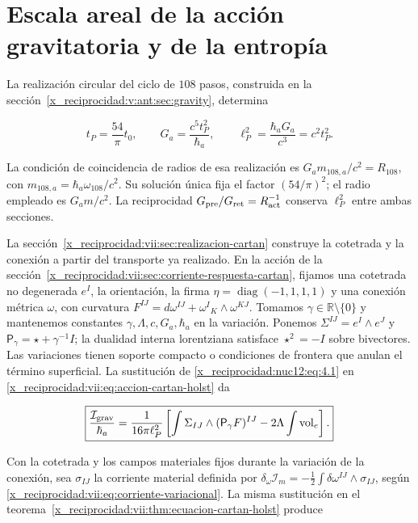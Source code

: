 \section{Escala areal de la acción gravitatoria y de la entropía}

La realización circular del ciclo de \(108\) pasos, construida en la sección~\ref{x_reciprocidad:v:ant:sec:gravity}, determina



\begin{equation}
t_P=\frac{54}{\pi}t_0,\qquad
G_a=\frac{c^5t_P^2}{\hbar_a},\qquad
\ell_P^2=\frac{\hbar_aG_a}{c^3}=c^2t_P^2.
\label{x_reciprocidad:nuc12:eq:4.1}
\end{equation}



La condición de coincidencia de radios de esa realización es \(G_a m_{108,a}/c^2=R_{108}\), con \(m_{108,a}=\hbar_a\omega_{108}/c^2\). Su solución única fija el factor \((54/\pi)^2\); el radio empleado es \(G_a m/c^2\). La reciprocidad \(G_{\rm pre}/G_{\rm ret}=R_{\rm act}^{-1}\) conserva \(\ell_P^2\) entre ambas secciones.

La sección~\ref{x_reciprocidad:vii:sec:realizacion-cartan} construye la cotetrada y la conexión a partir del transporte ya realizado. En la acción de la sección~\ref{x_reciprocidad:vii:sec:corriente-respuesta-cartan}, fijamos una cotetrada no degenerada \(e^I\), la orientación, la firma \(\eta=\operatorname{diag}(-1,1,1,1)\) y una conexión métrica \(\omega\), con curvatura \(F^{IJ}=d\omega^{IJ}+\omega^I{}_{K}\wedge\omega^{KJ}\). Tomamos \(\gamma\in\mathbb R\setminus\{0\}\) y mantenemos constantes \(\gamma,\Lambda,c,G_a,\hbar_a\) en la variación. Ponemos \(\Sigma^{IJ}=e^I\wedge e^J\) y \(\mathsf P_\gamma=\star+\gamma^{-1}I\); la dualidad interna lorentziana satisface \(\star^2=-I\) sobre bivectores. Las variaciones tienen soporte compacto o condiciones de frontera que anulan el término superficial. La sustitución de \eqref{x_reciprocidad:nuc12:eq:4.1} en \eqref{x_reciprocidad:vii:eq:accion-cartan-holst} da



\begin{equation}
\boxed{\frac{\mathcal I_{\rm grav}}{\hbar_a}
=\frac1{16\pi\ell_P^2}
\left[\int\Sigma_{IJ}\wedge(\mathsf P_\gamma F)^{IJ}
-2\Lambda\int\operatorname{vol}_e\right].}
\label{x_reciprocidad:nuc12:eq:4.2}
\end{equation}



Con la cotetrada y los campos materiales fijos durante la variación de la conexión, sea \(\sigma_{IJ}\) la corriente material definida por
\(\delta_\omega\mathcal I_m=-\tfrac12\int\delta\omega^{IJ}\wedge\sigma_{IJ}\), según \eqref{x_reciprocidad:vii:eq:corriente-variacional}. La misma sustitución en el teorema~\ref{x_reciprocidad:vii:thm:ecuacion-cartan-holst} produce



